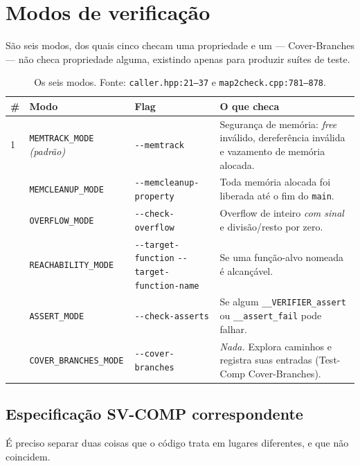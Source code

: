 \documentclass[11pt,a4paper]{article}
\newcommand{\code}[1]{\texttt{#1}}
\newcommand{\flag}[1]{\texttt{-\/-#1}}
\newcommand{\src}[1]{{\small\texttt{#1}}}
\begin{document}
\section{Modos de verificação}

São seis modos, dos quais cinco checam uma propriedade e um --- Cover-Branches
--- não checa propriedade alguma, existindo apenas para produzir suítes de
teste.

\begin{table}[H]
\centering
\small
\begin{tabularx}{\textwidth}{@{}l L{3.4cm} L{3.75cm} Y@{}}
\toprule
\textbf{\#} & \textbf{Modo} & \textbf{Flag} & \textbf{O que checa} \\
 & \code{MEMTRACK\_MODE} \newline \emph{(padrão)} & \flag{memtrack} &
Segurança de memória: \emph{free} inválido, dereferência inválida e vazamento
de memória alocada. \\
 & \code{MEMCLEANUP\_MODE} & \flag{memcleanup-property} &
Toda memória alocada foi liberada até o fim do \code{main}. \\
 & \code{OVERFLOW\_MODE} & \flag{check-overflow} &
Overflow de inteiro \emph{com sinal} e divisão/resto por zero. \\
 & \code{REACHABILITY\_MODE} & \flag{target-function} \newline
\flag{target-function-name} & Se uma função-alvo nomeada é alcançável. \\
 & \code{ASSERT\_MODE} & \flag{check-asserts} &
Se algum \code{\_\_VERIFIER\_assert} ou \code{\_\_assert\_fail} pode falhar. \\
 & \code{COVER\_BRANCHES\_MODE} & \flag{cover-branches} &
\emph{Nada.} Explora caminhos e registra suas entradas (Test-Comp
Cover-Branches). \\
\bottomrule
\end{tabularx}
\caption{Os seis modos. Fonte: \src{caller.hpp:21--37} e
\src{map2check.cpp:781--878}.}
\end{table}

\subsection{Especificação SV-COMP correspondente}

É preciso separar duas coisas que o código trata em lugares diferentes, e que
não coincidem.
\end{document}
